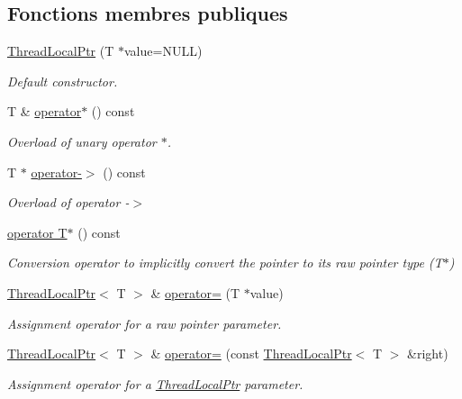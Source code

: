\subsection*{Fonctions membres publiques}
\begin{DoxyCompactItemize}
\item 
\hyperlink{classsf_1_1ThreadLocalPtr_a8c678211d7828d2a8c41cb534422d649}{Thread\+Local\+Ptr} (T $\ast$value=N\+U\+LL)
\begin{DoxyCompactList}\small\item\em Default constructor. \end{DoxyCompactList}\item 
T \& \hyperlink{classsf_1_1ThreadLocalPtr_adcbb45ae077df714bf9c61e936d97770}{operator$\ast$} () const
\begin{DoxyCompactList}\small\item\em Overload of unary operator $\ast$. \end{DoxyCompactList}\item 
T $\ast$ \hyperlink{classsf_1_1ThreadLocalPtr_a25646e1014a933d1a45b9ce17bab7703}{operator-\/$>$} () const
\begin{DoxyCompactList}\small\item\em Overload of operator -\/$>$ \end{DoxyCompactList}\item 
\hyperlink{classsf_1_1ThreadLocalPtr_a81ca089ae5cda72c7470ca93041c3cb2}{operator T$\ast$} () const
\begin{DoxyCompactList}\small\item\em Conversion operator to implicitly convert the pointer to its raw pointer type (T$\ast$) \end{DoxyCompactList}\item 
\hyperlink{classsf_1_1ThreadLocalPtr}{Thread\+Local\+Ptr}$<$ T $>$ \& \hyperlink{classsf_1_1ThreadLocalPtr_a14dcf1cdf5f6b3bcdd633014b2b671f5}{operator=} (T $\ast$value)
\begin{DoxyCompactList}\small\item\em Assignment operator for a raw pointer parameter. \end{DoxyCompactList}\item 
\hyperlink{classsf_1_1ThreadLocalPtr}{Thread\+Local\+Ptr}$<$ T $>$ \& \hyperlink{classsf_1_1ThreadLocalPtr_a6792a6a808af06f0d13e3ceecf2fc947}{operator=} (const \hyperlink{classsf_1_1ThreadLocalPtr}{Thread\+Local\+Ptr}$<$ T $>$ \&right)
\begin{DoxyCompactList}\small\item\em Assignment operator for a \hyperlink{classsf_1_1ThreadLocalPtr}{Thread\+Local\+Ptr} parameter. \end{DoxyCompactList}\end{DoxyCompactItemize}


